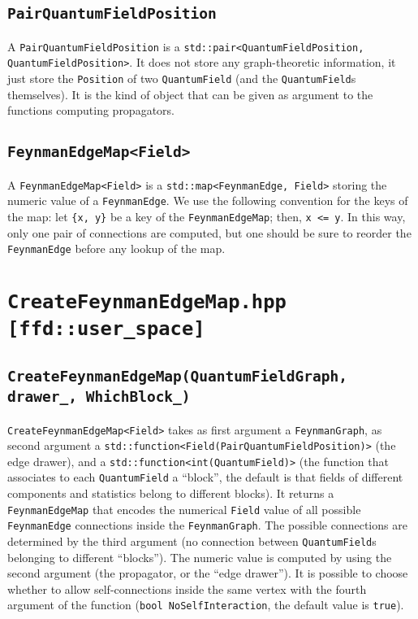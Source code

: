 \subsection{\texttt{PairQuantumFieldPosition}}
A \texttt{PairQuantumFieldPosition} is a \texttt{std::pair<QuantumFieldPosition, QuantumFieldPosition>}. It does not store any graph-theoretic information, it just store the \texttt{Position} of two \texttt{QuantumField} (and the \texttt{QuantumField}s themselves). It is the kind of object that can be given as argument to the functions computing propagators.
\subsection{\texttt{FeynmanEdgeMap<Field>}}
A \texttt{FeynmanEdgeMap<Field>} is a \texttt{std::map<FeynmanEdge, Field>} storing the numeric value of a \texttt{FeynmanEdge}. We use the following convention for the keys of the map: let \texttt{\{x, y\}} be a key of the \texttt{FeynmanEdgeMap}; then, \texttt{x <= y}. In this way, only one pair of connections are computed, but one should be sure to reorder the \texttt{FeynmanEdge} before any lookup of the map.
\section{\texttt{CreateFeynmanEdgeMap.hpp [ffd::user\_space]}}
\subsection{\texttt{CreateFeynmanEdgeMap(QuantumFieldGraph, drawer\_, WhichBlock\_)}}
\texttt{CreateFeynmanEdgeMap<Field>} takes as first argument a \texttt{FeynmanGraph}, as second argument a \texttt{std::function<Field(PairQuantumFieldPosition)>} (the edge drawer), and a \texttt{std::function<int(QuantumField)>} (the function that associates to each \texttt{QuantumField} a ``block'', the default is that fields of different components and statistics belong to different blocks). It returns a \texttt{FeynmanEdgeMap} that encodes the numerical \texttt{Field} value of all possible \texttt{FeynmanEdge} connections inside the \texttt{FeynmanGraph}. The possible connections are determined by the third argument (no connection between \texttt{QuantumField}s belonging to different ``blocks''). The numeric value is computed by using the second argument (the propagator, or the ``edge drawer''). It is possible to choose whether to allow self-connections inside the same vertex with the fourth argument of the function (\texttt{bool NoSelfInteraction}, the default value is \texttt{true}).

